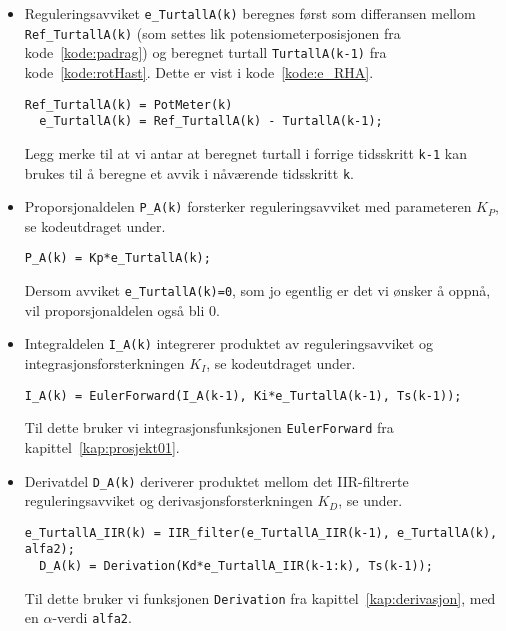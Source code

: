 \begin{itemize}
\setlength\itemsep{0mm}
\item
  Reguleringsavviket {\tt e\_TurtallA(k)}  beregnes først som differansen
  mellom {\tt Ref\_TurtallA(k)} (som settes lik potensiometerposisjonen 
  fra kode~\ref{kode:padrag}) og beregnet
  turtall {\tt TurtallA(k-1)} fra
  kode~\ref{kode:rotHast}. Dette er vist i kode~\ref{kode:e_RHA}.
\begin{lstlisting}[caption=Beregning av reguleringsavviket {\tt e\_TurtallA(k)}., 
  label=kode:e_RHA, firstnumber=15]
  Ref_TurtallA(k) = PotMeter(k)
  e_TurtallA(k) = Ref_TurtallA(k) - TurtallA(k-1);
\end{lstlisting}
Legg merke til at vi antar at beregnet turtall i forrige
tidsskritt {\tt k-1} kan brukes til å beregne et avvik i nåværende
tidsskritt {\tt k}.

\item Proporsjonaldelen {\tt P\_A(k)} forsterker
  reguleringsavviket med
  parameteren $K_{P}$, se kodeutdraget under. 
\begin{lstlisting}[caption={Beregning av P-delen for motor A, {\tt P\_A(k)}.}, 
  label=kode:P_del, firstnumber=17]
  P_A(k) = Kp*e_TurtallA(k);
\end{lstlisting}
  Dersom avviket {\tt e\_TurtallA(k)=0},  som jo egentlig er det vi ønsker å
  oppnå, vil proporsjonaldelen også bli 0.  

\item Integraldelen {\tt I\_A(k)} integrerer produktet av reguleringsavviket og 
  integrasjonsforsterkningen $K_{I}$, se kodeutdraget under. 
\begin{lstlisting}[caption={Beregning av I-delen  for motor A {\tt I\_A(k)}.}, 
  label=kode:I_del, firstnumber=18]
  I_A(k) = EulerForward(I_A(k-1), Ki*e_TurtallA(k-1), Ts(k-1));
\end{lstlisting}
Til dette bruker
vi integrasjonsfunksjonen {\tt EulerForward} fra kapittel~\ref{kap:prosjekt01}.

\item Derivatdel {\tt D\_A(k)} deriverer produktet mellom det
  IIR-filtrerte reguleringsavviket og
  derivasjonsforsterkningen $K_{D}$, se under. 
\begin{lstlisting}[caption={Beregning av D-delen for motor A, {\tt D\_A(k)}.}, 
  label=kode:D_del, firstnumber=19]
  e_TurtallA_IIR(k) = IIR_filter(e_TurtallA_IIR(k-1), e_TurtallA(k), alfa2);
  D_A(k) = Derivation(Kd*e_TurtallA_IIR(k-1:k), Ts(k-1));
\end{lstlisting}
Til dette bruker vi funksjonen {\tt Derivation} fra
kapittel~\ref{kap:derivasjon}, med en $\alpha$-verdi {\tt alfa2}.


\end{itemize}
